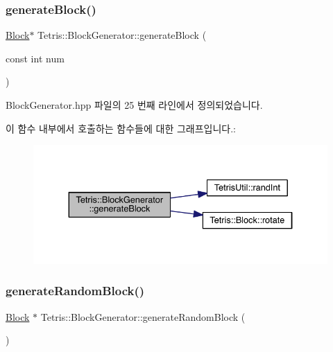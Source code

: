 \subsubsection{\texorpdfstring{generate\+Block()}{generateBlock()}\hspace{0.1cm}{\footnotesize\ttfamily [2/2]}}
{\footnotesize\ttfamily \hyperlink{class_tetris_1_1_block}{Block}$\ast$ Tetris\+::\+Block\+Generator\+::generate\+Block (\begin{DoxyParamCaption}\item[{const int}]{num }\end{DoxyParamCaption})\hspace{0.3cm}{\ttfamily [inline]}}



Block\+Generator.\+hpp 파일의 25 번째 라인에서 정의되었습니다.

이 함수 내부에서 호출하는 함수들에 대한 그래프입니다.\+:
\nopagebreak
\begin{figure}[H]
\begin{center}
\leavevmode
\includegraphics[width=334pt]{class_tetris_1_1_block_generator_a584fde2bfe1cdd4505bd905befd73d21_cgraph}
\end{center}
\end{figure}
\mbox{\label{class_tetris_1_1_block_generator_a10dfe1467d40437ad41c5ae76437ad78}} 
\subsubsection{\texorpdfstring{generate\+Random\+Block()}{generateRandomBlock()}\hspace{0.1cm}{\footnotesize\ttfamily [1/2]}}
{\footnotesize\ttfamily \hyperlink{class_tetris_1_1_block}{Block} $\ast$ Tetris\+::\+Block\+Generator\+::generate\+Random\+Block (\begin{DoxyParamCaption}{ }\end{DoxyParamCaption})}



